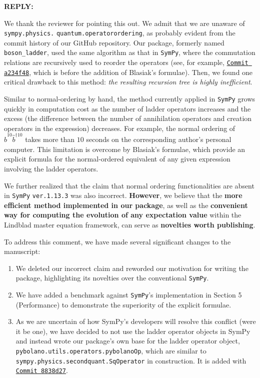 \documentclass[12pt, a4paper]{article}
\newcommand{\code}[1]{\colorbox{gray!25}{\texttt{#1}}}
\newenvironment{reva}{%
\color{Black}
\par
\textbf{REPLY:}
\par
}
{\bigskip}
\begin{document}
\begin{reva}
We thank the reviewer for pointing this out. We admit that we are unaware of \code{sympy.physics.} \code{quantum.operatorordering}, as probably evident from the commit history of our GitHub repository. Our package, formerly named \code{boson\_ladder}, used the same algorithm as that in \texttt{SymPy}, where the commutation relations are recursively used to reorder the operators (see, for example, \href{https://github.com/hendry24/pyBoLaNO/commit/a234f48a53158e1c9502d17959dfb6a72fcde767}{\texttt{Commit a234f48}}, which is before the addition of Blasiak's formulae). Then, we found one critical drawback to this method: \emph{the resulting recursion tree is highly inefficient}. 

Similar to normal-ordering by hand, the method currently applied in \texttt{SymPy} grows quickly in computation cost as the number of ladder operators increases and the excess (the difference between the number of annihilation operators and creation operators in the expression) decreases. For example, the normal ordering of $\hat{b}^{10}\hat{b}^{\dagger 10}$ takes more than $10$ seconds on the corresponding author's personal computer. This limitation is overcome by Blasiak's formulae, which provide an explicit formula for the normal-ordered equivalent of any given expression involving the ladder operators. 

We further realized that the claim that normal ordering functionalities are absent in \texttt{SymPy} \code{ver.1.13.3} was also incorrect. \textbf{However}, we believe that the \textbf{more efficient method implemented in our package}, as well as the \textbf{convenient way for computing the evolution of any expectation value} within the Lindblad master equation framework, can serve as \textbf{novelties worth publishing}. 

To address this comment, we have made several significant changes to the manuscript:
\begin{enumerate}
    \item We deleted our incorrect claim and reworded our motivation for writing the package, highlighting its novelties over the conventional \texttt{SymPy}. 
    \item We have added a benchmark against \texttt{SymPy}'s implementation in Section 5 (Performance) to demonstrate the superiority of the explicit formulae.
    \item As we are uncertain of how SymPy's developers will resolve this conflict (were it be one), we have decided to not use the ladder operator objects in SymPy and instead wrote our package's own base for the ladder operator object, \texttt{pybolano.utils.operators.pybolanoOp}, which are similar to \texttt{sympy.physics.secondquant.SqOperator} in construction. It is added with \href{https://github.com/hendry24/pyBoLaNO/commit/8838d27293e6475f92c1827ddb7ad3e6f3e8471a}{\texttt{Commit 8838d27}}.
\end{enumerate}
\end{reva}
\end{document}
